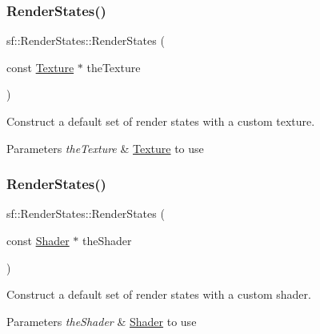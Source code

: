 \subsubsection{\texorpdfstring{Render\+States()}{RenderStates()}\hspace{0.1cm}{\footnotesize\ttfamily [4/6]}}
{\footnotesize\ttfamily sf\+::\+Render\+States\+::\+Render\+States (\begin{DoxyParamCaption}\item[{const \hyperlink{classsf_1_1_texture}{Texture} $\ast$}]{the\+Texture }\end{DoxyParamCaption})}



Construct a default set of render states with a custom texture. 


\begin{DoxyParams}{Parameters}
{\em the\+Texture} & \hyperlink{classsf_1_1_texture}{Texture} to use \\
\hline
\end{DoxyParams}
\mbox{\label{classsf_1_1_render_states_a39f94233f464739d8d8522f3aefe97d0}} 
\subsubsection{\texorpdfstring{Render\+States()}{RenderStates()}\hspace{0.1cm}{\footnotesize\ttfamily [5/6]}}
{\footnotesize\ttfamily sf\+::\+Render\+States\+::\+Render\+States (\begin{DoxyParamCaption}\item[{const \hyperlink{classsf_1_1_shader}{Shader} $\ast$}]{the\+Shader }\end{DoxyParamCaption})}



Construct a default set of render states with a custom shader. 


\begin{DoxyParams}{Parameters}
{\em the\+Shader} & \hyperlink{classsf_1_1_shader}{Shader} to use \\
\hline
\end{DoxyParams}
\mbox{\label{classsf_1_1_render_states_ab5eda13cd8c79c74eba3b1b0df817d67}} 
